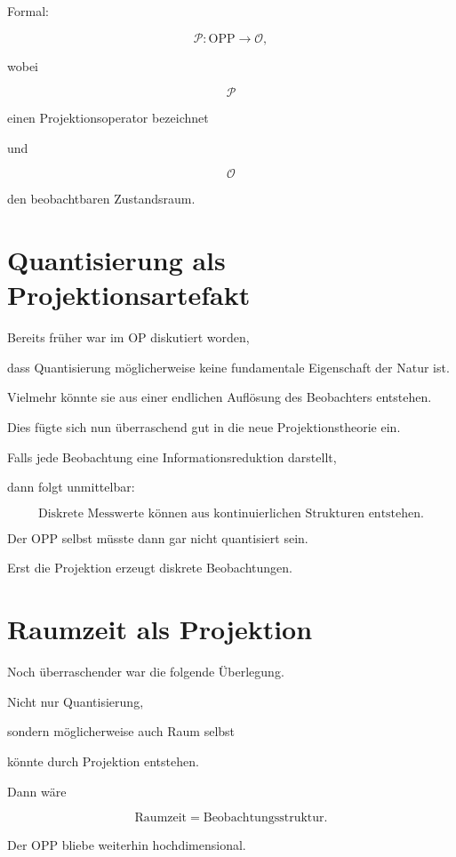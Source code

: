 Formal:

\[
\mathcal{P}
:
\mathrm{OPP}
\rightarrow
\mathcal{O},
\]

wobei

\[
\mathcal{P}
\]

einen Projektionsoperator bezeichnet

und

\[
\mathcal{O}
\]

den beobachtbaren Zustandsraum.


\section*{Quantisierung als Projektionsartefakt}

Bereits früher war im OP diskutiert worden,

dass Quantisierung möglicherweise keine fundamentale Eigenschaft der Natur ist.

Vielmehr könnte sie aus einer endlichen Auflösung des Beobachters entstehen.

Dies fügte sich nun überraschend gut in die neue Projektionstheorie ein.

Falls jede Beobachtung eine Informationsreduktion darstellt,

dann folgt unmittelbar:

\[
\boxed{
\text{Diskrete Messwerte können aus kontinuierlichen Strukturen entstehen.}
}
\]

Der OPP selbst müsste dann gar nicht quantisiert sein.

Erst die Projektion erzeugt diskrete Beobachtungen.


\section*{Raumzeit als Projektion}

Noch überraschender war die folgende Überlegung.

Nicht nur Quantisierung,

sondern möglicherweise auch Raum selbst

könnte durch Projektion entstehen.

Dann wäre

\[
\boxed{
\text{Raumzeit}
=
\text{Beobachtungsstruktur}.
}
\]

Der OPP bliebe weiterhin hochdimensional.

